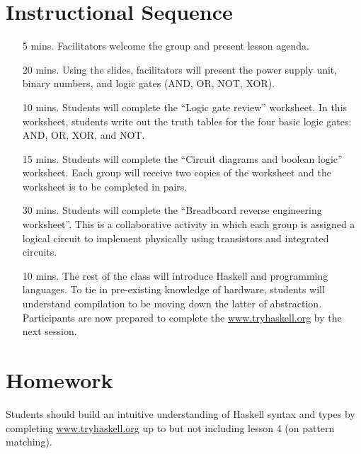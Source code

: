 \documentclass[11pt]{article}
\begin{document}
\section*{Instructional Sequence}

\begin{itemize}
  \item[5 mins.]
    Facilitators welcome the group and present lesson agenda.

  \item[20 mins.]
    Using the slides, facilitators will present the power supply unit, binary
    numbers, and logic gates (AND, OR, NOT, XOR).

  \item[10 mins.]
    Students will complete the ``Logic gate review'' worksheet.
    In this worksheet, students write out the truth tables for the four basic
    logic gates: AND, OR, XOR, and NOT.

  \item[15 mins.]
    Students will complete the ``Circuit diagrams and boolean logic''
    worksheet.
    Each group will receive two copies of the worksheet and the worksheet is to
    be completed in pairs.

  \item[30 mins.]
    Students will complete the ``Breadboard reverse engineering worksheet''.
    This is a collaborative activity in which each group is assigned a logical
    circuit to implement physically using transistors and integrated circuits.

  \item[10 mins.]
    The rest of the class will introduce Haskell and programming languages. To
    tie in pre-existing knowledge of hardware, students will understand
    compilation to be moving down the latter of abstraction. Participants are
    now prepared to complete the \url{www.tryhaskell.org} by the next session.
\end{itemize}

\section*{Homework}

Students should build an intuitive understanding of Haskell syntax and types
by completing \url{www.tryhaskell.org} up to but not including lesson 4 (on
pattern matching).
\end{document}
